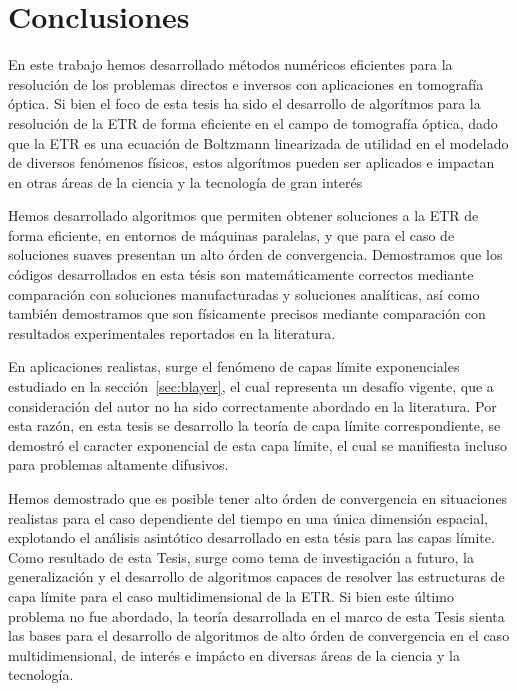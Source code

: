 \pagestyle{fancy}
\chapter{Conclusiones}
\label{cap:conc}
\lhead{\thepage}
\vspace{0.01\textheight}
\pagebreak
En este trabajo hemos desarrollado métodos numéricos eficientes 
para la resolución de los problemas directos e inversos con 
aplicaciones en tomografía óptica. 
Si bien el foco de esta tesis ha sido el desarrollo de algorítmos 
para la resolución de la ETR de forma eficiente en el campo 
de tomografía óptica, 
dado que la ETR es una ecuación de Boltzmann 
linearizada de utilidad en el modelado de diversos 
fenómenos físicos, estos algorítmos pueden ser aplicados e impactan 
en otras áreas de la ciencia y la tecnología de gran interés~\cite{Howell2010, Thynell1998,Duderstadt1979,Qin2015,Dymond1997,Chandrasekhar1960,Zhu2005,Zhu2010,Vassiliev2010,Bedford2019,Vassiliev2010,Bedford2019,Larsen2006, Sanchez1982, Anli2006,Mishchenko1999, Prasher2003}

 Hemos desarrollado algoritmos que permiten obtener soluciones 
 a la ETR de forma eficiente, en entornos de máquinas paralelas, 
 y que para el caso de soluciones suaves presentan un alto órden de convergencia. 
 Demostramos que los códigos desarrollados en esta tésis son matemáticamente 
 correctos mediante comparación con soluciones manufacturadas y soluciones 
 analíticas, así como también demostramos que son físicamente 
 precisos mediante comparación con resultados experimentales 
 reportados en la literatura.
 
 En aplicaciones realistas, surge el fenómeno de capas límite exponenciales 
 estudiado en la sección~\ref{sec:blayer}, el cual representa un desafío 
 vigente, que a consideración del autor no ha sido correctamente 
 abordado en la literatura. Por esta razón, en esta tesis 
 se desarrollo la teoría de capa límite correspondiente, se demostró 
 el caracter exponencial de esta capa límite, el cual se manifiesta 
 incluso para problemas altamente difusivos.
 
 Hemos demostrado que es posible 
 tener alto órden de convergencia en situaciones realistas para 
 el caso dependiente del tiempo en una única dimensión espacial, 
 explotando el análisis asintótico desarrollado en esta tésis para las capas límite. 
 Como resultado de esta Tesis, 
 surge como tema de investigación a futuro, la generalización y el desarrollo de algoritmos capaces 
 de resolver las estructuras de capa límite para el caso 
 multidimensional de la ETR. Si bien este último problema no fue abordado, 
 la teoría desarrollada en el marco de esta Tesis sienta las bases 
 para el desarrollo de algoritmos de alto órden de convergencia en el 
 caso multidimensional, de interés e impácto en diversas 
 áreas de la ciencia y la tecnología. 
 
